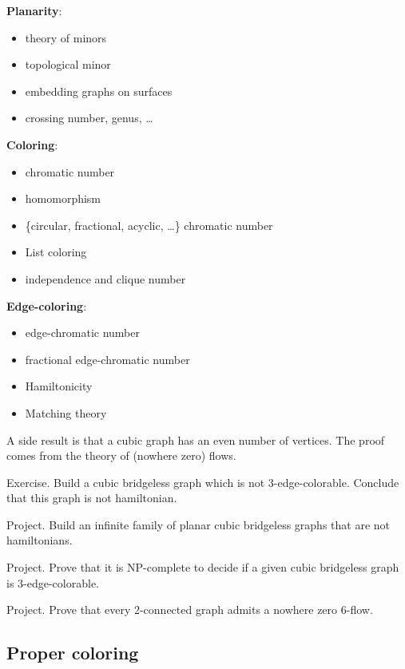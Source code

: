 \documentclass[12pt,a4paper]{article}
\begin{document}
\textbf{Planarity}:
\begin{itemize}
\item theory of minors
\item topological minor
\item embedding graphs on surfaces
\item crossing number, genus, …
\end{itemize}
\vspace{0.3cm}

\textbf{Coloring}:
\begin{itemize}
\item chromatic number
\item homomorphism
\item \{circular, fractional, acyclic, …\} chromatic number
\item List coloring
\item independence and clique number
\end{itemize}
\vspace{0.3cm}

\textbf{Edge-coloring}:
\begin{itemize}
\item edge-chromatic number
\item fractional edge-chromatic number
\item Hamiltonicity
\item Matching theory
\end{itemize}
\vspace{0.3cm}

A side result is that a cubic graph has an even number of vertices. The proof
comes from the theory of (nowhere zero) flows.

Exercise. Build a cubic bridgeless graph which is not 3-edge-colorable. Conclude
that this graph is not hamiltonian.

Project. Build an infinite family of planar cubic bridgeless graphs that are not
hamiltonians.

Project. Prove that it is NP-complete to decide if a given cubic bridgeless
graph is 3-edge-colorable.

Project. Prove that every 2-connected graph admits a nowhere zero 6-flow.

\subsection{Proper coloring}

\begin{center}
\end{center}
\end{document}
